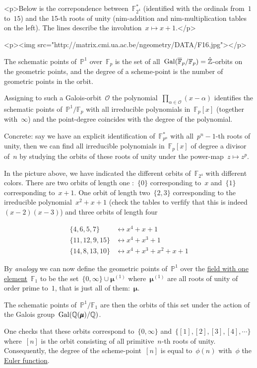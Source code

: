 <p>Below is the correpondence between~$\mathbb{F}_{2^4}^{\ast}$ (identified with the ordinals from~$1$ to~$15$) and the 15-th roots of unity (nim-addition and nim-multiplication tables on the left). The lines describe the involution~$x \mapsto x+1$.</p>

<p><img src="http://matrix.cmi.ua.ac.be/ngeometry/DATA/F16.jpg"></p>

The schematic points of~$\mathbb{P}^1$ over~$\mathbb{F}_p$ is the set of all~$\operatorname{Gal}(\overline{\mathbb{F}}_p/\mathbb{F}_p) = \hat{\mathbb{Z}}$-orbits on the geometric points, and the degree of a scheme-point is the number of geometric points in the orbit.

Assigning to such a Galois-orbit~$\mathcal{O}$ the polynomial~$\prod_{\alpha \in \mathcal{O}} (x-\alpha)$ identifies the schematic points of~$\mathbb{P}^1/\mathbb{F}_p$ with all irreducible polynomials in~$\mathbb{F}_p[x]$ (together with~$\infty$) and the point-degree coincides with the degree of the polynomial.

Concrete: say we have an explicit identification of~$\mathbb{F}_{p^n}^{\ast}$ with all~$p^n-1$-th roots of unity, then we can find all irreducible polynomials in~$\mathbb{F}_p[x]$ of degree a divisor of~$n$ by studying the orbits of these roots of unity under the power-map~$z \mapsto z^p$.

In the picture above, we have indicated the different orbits of~$\mathbb{F}_{2^4}$ with different colors. There are two orbits of length one :~$\{ 0 \}$ corresponding to~$x$ and~$\{ 1 \}$ corresponding to~$x+1$. One orbit of length two~$\{ 2,3 \}$ corresponding to the irreducible polynomial~$x^2+x+1$ (check the tables to verfify that this is indeed~$(x-2)(x-3)$) and three orbits of length four

\begin{equation}
  \begin{aligned}
    \{ 4,6,5,7 \} &\leftrightarrow x^4+x+1 \\
    \{ 11,12,9,15 \} &\leftrightarrow x^4+x^3+1 \\
    \{ 14,8,13,10 \} &\leftrightarrow x^4+x^3+x^2+x+1
  \end{aligned}
\end{equation}

By \emph{analogy} we can now define the geometric points of~$\mathbb{P}^1$ over the \href{http://en.wikipedia.org/wiki/Field_with_one_element}{field with one element}~$\mathbb{F}_1$ to be the set~$\{ 0,\infty \} \cup \pmb{\mu}^{(1)}$ where~$\pmb{\mu}^{(1)}$ are all roots of unity of order prime to~$1$, that is just all of them:~$\pmb{\mu}$.

The schematic points of~$\mathbb{P}^1/\mathbb{F}_1$ are then the orbits of this set under the action of the Galois group~$\operatorname{Gal}(\mathbb{Q}(\pmb{\mu})/\mathbb{Q})$.

One checks that these orbits correspond to~$\{ 0,\infty \}$ and~$\{ [1],[2],[3],[4],\cdots \}$ where~$[n]$ is the orbit consisting of all primitive~$n$-th roots of unity. Consequently, the degree of the scheme-point~$[n]$ is equal to~$\phi(n)$ with~$\phi$ the \href{http://en.wikipedia.org/wiki/Euler's_totient_function}{Euler function}.
